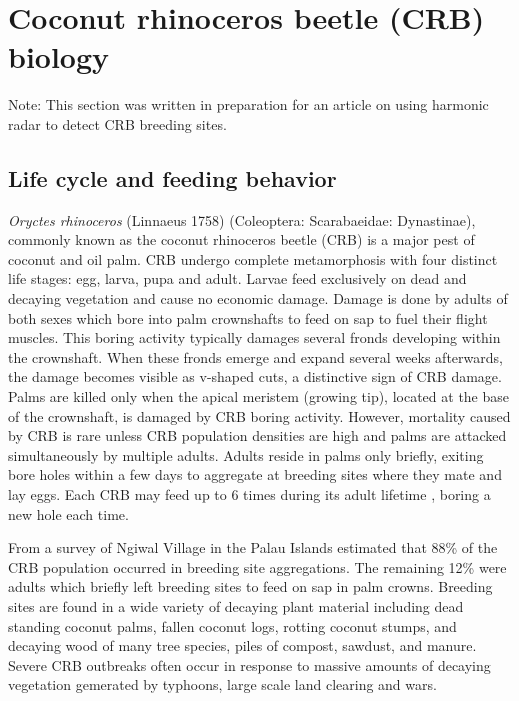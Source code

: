 \documentclass[12pt,letterpaper,english,bibliography=totocnumbered, abstract=on]{scrartcl}
\begin{document}
\section{Coconut rhinoceros beetle (CRB) biology}

Note: This section was written in preparation for an article on using harmonic radar to detect CRB breeding sites.

\subsection{Life cycle and feeding behavior}

\textit{Oryctes rhinoceros} (Linnaeus 1758) (Coleoptera: Scarabaeidae: Dynastinae), commonly known as the coconut rhinoceros beetle (CRB) is a major pest of  coconut and oil palm. CRB undergo complete metamorphosis with four distinct life stages: egg, larva, pupa and adult. Larvae feed exclusively on dead and decaying vegetation and cause no economic damage. Damage is done by adults of both sexes which bore into palm crownshafts to feed on sap to fuel their flight muscles. This boring activity typically damages several fronds developing within the crownshaft. When these fronds emerge and expand several weeks afterwards, the damage becomes visible as v-shaped cuts, a distinctive sign of CRB damage. Palms are killed only when the apical meristem (growing tip), located at the base of the crownshaft, is damaged by CRB boring activity. However, mortality caused by CRB is rare unless CRB population densities are high and palms are attacked simultaneously by multiple adults. Adults reside in palms only briefly, exiting bore holes within a few days to aggregate at breeding sites where they mate and lay eggs. Each CRB may feed up to 6 times during its adult lifetime \parencite{vander_meer_indirect_1975}, boring a new hole each time.

From a survey of Ngiwal Village in the Palau Islands \cite{gressitt_coconut_1953} estimated that 88\% of the CRB population occurred in breeding site aggregations. The remaining 12\% were adults which briefly left breeding sites to feed on sap in palm crowns. Breeding sites are found in a wide variety of decaying plant material including dead standing coconut palms, fallen coconut logs, rotting coconut stumps, and decaying wood of many tree species, piles of compost, sawdust, and manure. Severe CRB outbreaks often occur in response to massive amounts of decaying vegetation gemerated by typhoons, large scale land clearing and wars.
\end{document}
